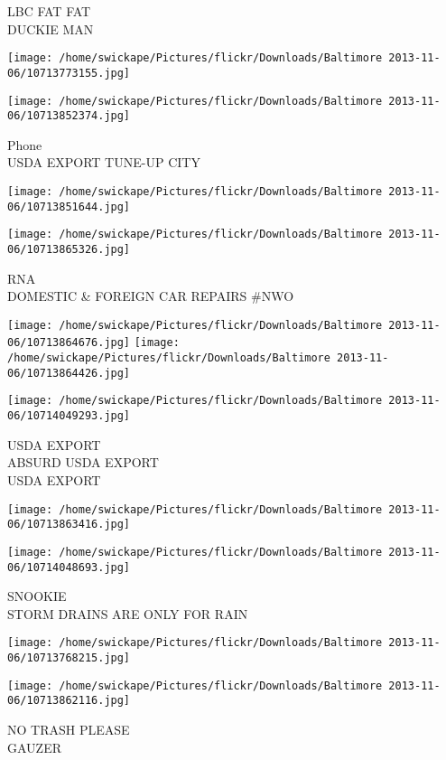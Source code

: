 \documentclass[10pt,letterpaper]{article}
\begin{document}
LBC FAT FAT\\
DUCKIE MAN
\pagebreak

\texttt{[image: /home/swickape/Pictures/flickr/Downloads/Baltimore 2013-11-06/10713773155.jpg]}

\vspace{0.25in}
\texttt{[image: /home/swickape/Pictures/flickr/Downloads/Baltimore 2013-11-06/10713852374.jpg]}

Phone\\
USDA EXPORT TUNE{-}UP CITY
\pagebreak

\texttt{[image: /home/swickape/Pictures/flickr/Downloads/Baltimore 2013-11-06/10713851644.jpg]}

\vspace{0.25in}
\texttt{[image: /home/swickape/Pictures/flickr/Downloads/Baltimore 2013-11-06/10713865326.jpg]}

RNA\\
DOMESTIC \& FOREIGN CAR REPAIRS \#NWO
\pagebreak

\texttt{[image: /home/swickape/Pictures/flickr/Downloads/Baltimore 2013-11-06/10713864676.jpg]}
\texttt{[image: /home/swickape/Pictures/flickr/Downloads/Baltimore 2013-11-06/10713864426.jpg]}

\texttt{[image: /home/swickape/Pictures/flickr/Downloads/Baltimore 2013-11-06/10714049293.jpg]}

USDA EXPORT\\
ABSURD USDA EXPORT\\
USDA EXPORT
\pagebreak

\texttt{[image: /home/swickape/Pictures/flickr/Downloads/Baltimore 2013-11-06/10713863416.jpg]}

\vspace{0.25in}
\texttt{[image: /home/swickape/Pictures/flickr/Downloads/Baltimore 2013-11-06/10714048693.jpg]}

SNOOKIE\\
STORM DRAINS ARE ONLY FOR RAIN
\pagebreak

\texttt{[image: /home/swickape/Pictures/flickr/Downloads/Baltimore 2013-11-06/10713768215.jpg]}

\vspace{0.25in}
\texttt{[image: /home/swickape/Pictures/flickr/Downloads/Baltimore 2013-11-06/10713862116.jpg]}

NO TRASH PLEASE\\
GAUZER
\pagebreak
\end{document}

